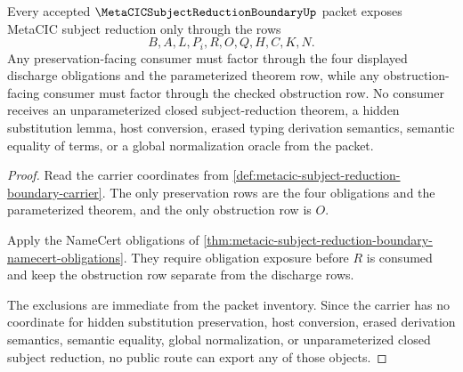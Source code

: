 \begin{theorem}
\label{thm:metacic-subject-reduction-boundary-nonescape}
Every accepted $\MetaCICSubjectReductionBoundaryUp$ packet exposes MetaCIC subject reduction only through the rows
$$
B,A,L,P_i,R,O,Q,H,C,K,N.
$$
Any preservation-facing consumer must factor through the four displayed discharge obligations and the parameterized theorem row, while any obstruction-facing consumer must factor through the checked obstruction row. No consumer receives an unparameterized closed subject-reduction theorem, a hidden substitution lemma, host conversion, erased typing derivation semantics, semantic equality of terms, or a global normalization oracle from the packet.
\end{theorem}
\begin{proof}
Read the carrier coordinates from \autoref{def:metacic-subject-reduction-boundary-carrier}. The only preservation rows are the four obligations and the parameterized theorem, and the only obstruction row is $O$.

Apply the NameCert obligations of \autoref{thm:metacic-subject-reduction-boundary-namecert-obligations}. They require obligation exposure before $R$ is consumed and keep the obstruction row separate from the discharge rows.

The exclusions are immediate from the packet inventory. Since the carrier has no coordinate for hidden substitution preservation, host conversion, erased derivation semantics, semantic equality, global normalization, or unparameterized closed subject reduction, no public route can export any of those objects.
\end{proof}

